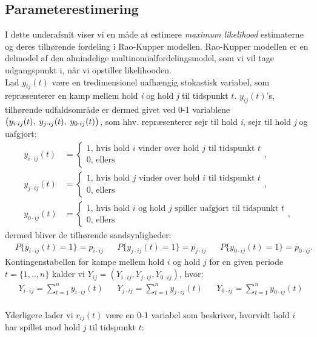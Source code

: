 \documentclass[11pt,a4paper]{article}
\begin{document}
\subsection{Parameterestimering}
I dette underafsnit viser vi en måde at estimere \textit{maximum likelihood} estimaterne og deres tilhørende fordeling i Rao-Kupper modellen.
Rao-Kupper modellen er en delmodel af den almindelige multinomialfordelingsmodel, som vi vil tage udgangspunkt i, når vi opstiller likelihooden.\\
Lad $y_{ij}(t)$ være en tredimensionel uafhængig stokastisk variabel, som repræsenterer en kamp mellem hold \textit{i} og hold \textit{j} til tidspunkt $t$. $y_{ij}(t)$'s, tilhørende udfaldsområde er dermed givet ved 0-1 variablene $\big{(}y_{i\cdot ij}(t),\;y_{j\cdot ij}(t),\;y_{0\cdot ij}(t)\big{)}$, som hhv. repræsenterer sejr til hold \textit{i}, sejr til hold \textit{j} og uafgjort: 
\begin{align*}
  y_{i\cdot ij}(t)&=\begin{cases}
1\text{, hvis hold $i$ vinder over hold $j$ til tidspunkt $t$}\\
0\text{, ellers}
\end{cases},\\
 y_{j\cdot ij}(t)&=\begin{cases}
1\text{, hvis hold $j$ vinder over hold $i$ til tidspunkt $t$}\\
0\text{, ellers}
\end{cases},\\
 y_{0\cdot ij}(t)&=\begin{cases}
1\text{, hvis hold $i$ og hold $j$ spiller uafgjort til tidspunkt $t$}\\
0\text{, ellers}
\end{cases},
\end{align*}
dermed bliver de tilhørende sandsynligheder:
\begin{align*}
   &P\{y_{i\cdot ij}(t)=1\}=p_{i\cdot ij} &&P\{y_{j\cdot ij}(t)=1\}=p_{j\cdot ij} &&P\{y_{0\cdot ij}(t)=1\}=p_{0\cdot ij}.
\end{align*}
 Kontingenstabellen for kampe mellem hold $i$ og hold $j$ for en given periode $t=\{1,..,n\}$ kalder vi $Y_{ij}=(Y_{i\cdot ij},Y_{j\cdot ij},Y_{0\cdot ij})$, hvor:
\begin{align*}
    &Y_{i\cdot ij}=\sum_{t=1}^{n}y_{i\cdot ij}(t) &&Y_{j\cdot ij}=\sum_{t=1}^ny_{j\cdot ij}(t) &&Y_{0\cdot ij}=\sum_{t=1}^ny_{0\cdot ij}(t)
\end{align*}
\\
Yderligere lader vi $r_{ij}(t)$ være en 0-1 variabel som beskriver, hvorvidt hold $i$ har spillet mod hold $j$ til tidspunkt $t$:
\end{document}
